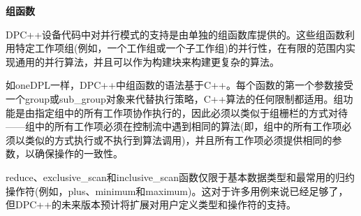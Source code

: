 \hspace*{\fill} \par %
\textbf{组函数}

DPC++设备代码中对并行模式的支持是由单独的组函数库提供的。这些组函数利用特定工作项组(例如，一个工作组或一个子工作组)的并行性，在有限的范围内实现通用的并行算法，并且可以作为构建块来构建更复杂的算法。\par

如oneDPL一样，DPC++中组函数的语法基于C++。每个函数的第一个参数接受一个group或sub\_group对象来代替执行策略，C++算法的任何限制都适用。组功能是由指定组中的所有工作项协作执行的，因此必须以类似于组栅栏的方式对待——组中的所有工作项必须在控制流中遇到相同的算法(即，组中的所有工作项必须以类似的方式执行或不执行到算法调用)，并且所有工作项必须提供相同的参数，以确保操作的一致性。\par

reduce、exclusive\_scan和inclusive\_scan函数仅限于基本数据类型和最常用的归约操作符(例如，plus、minimum和maximum)。这对于许多用例来说已经足够了，但DPC++的未来版本预计将扩展对用户定义类型和操作符的支持。\par

